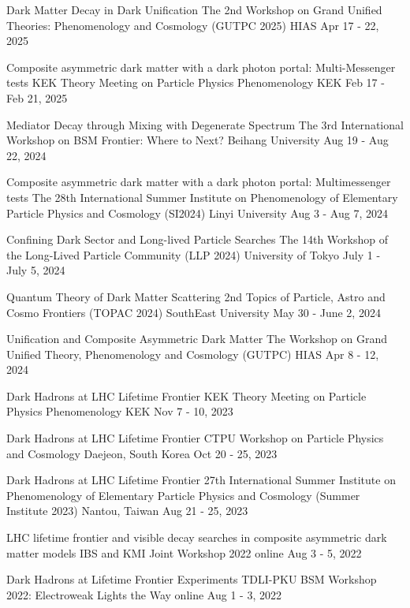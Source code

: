 \begin{talklist}
\talkentry
  {Dark Matter Decay in Dark Unification}
  {The 2nd Workshop on Grand Unified Theories: Phenomenology and Cosmology (GUTPC 2025)}
  {HIAS}
  {Apr 17 - 22, 2025}
  {}

\talkentry
  {Composite asymmetric dark matter with a dark photon portal: Multi-Messenger tests}
  {KEK Theory Meeting on Particle Physics Phenomenology}
  {KEK}
  {Feb 17 - Feb 21, 2025}
  {}

\talkentry
  {Mediator Decay through Mixing with Degenerate Spectrum}
  {The 3rd International Workshop on BSM Frontier: Where to Next?}
  {Beihang University}
  {Aug 19 - Aug 22, 2024}
  {}

\talkentry
  {Composite asymmetric dark matter with a dark photon portal: Multimessenger tests}
  {The 28th International Summer Institute on Phenomenology of Elementary Particle Physics and Cosmology (SI2024)}
  {Linyi University}
  {Aug 3 - Aug 7, 2024}
  {}

\talkentry
  {Confining Dark Sector and Long-lived Particle Searches}
  {The 14th Workshop of the Long-Lived Particle Community (LLP 2024)}
  {University of Tokyo}
  {July 1 - July 5, 2024}
  {}

\talkentry
  {Quantum Theory of Dark Matter Scattering}
  {2nd Topics of Particle, Astro and Cosmo Frontiers (TOPAC 2024)}
  {SouthEast University}
  {May 30 - June 2, 2024}
  {}

\talkentry
  {Unification and Composite Asymmetric Dark Matter}
  {The Workshop on Grand Unified Theory, Phenomenology and Cosmology (GUTPC)}
  {HIAS}
  {Apr 8 - 12, 2024}
  {}

\talkentry
  {Dark Hadrons at LHC Lifetime Frontier}
  {KEK Theory Meeting on Particle Physics Phenomenology}
  {KEK}
  {Nov 7 - 10, 2023}
  {}

\talkentry
  {Dark Hadrons at LHC Lifetime Frontier}
  {CTPU Workshop on Particle Physics and Cosmology}
  {Daejeon, South Korea}
  {Oct 20 - 25, 2023}
  {}

\talkentry
  {Dark Hadrons at LHC Lifetime Frontier}
  {27th International Summer Institute on Phenomenology of Elementary Particle Physics and Cosmology (Summer Institute 2023)}
  {Nantou, Taiwan}
  {Aug 21 - 25, 2023}
  {}

\talkentry
  {LHC lifetime frontier and visible decay searches in composite asymmetric dark matter models}
  {IBS and KMI Joint Workshop 2022}
  {online}
  {Aug 3 - 5, 2022}
  {}

\talkentry
  {Dark Hadrons at Lifetime Frontier Experiments}
  {TDLI-PKU BSM Workshop 2022: Electroweak Lights the Way}
  {online}
  {Aug 1 - 3, 2022}
  {}


\end{talklist}
